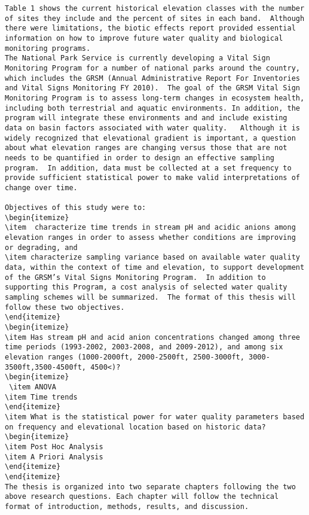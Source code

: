 \begin{verbatim}
Table 1 shows the current historical elevation classes with the number of sites they include and the percent of sites in each band.  Although there were limitations, the biotic effects report provided essential information on how to improve future water quality and biological monitoring programs.
The National Park Service is currently developing a Vital Sign Monitoring Program for a number of national parks around the country, which includes the GRSM (Annual Administrative Report For Inventories and Vital Signs Monitoring FY 2010).  The goal of the GRSM Vital Sign Monitoring Program is to assess long-term changes in ecosystem health, including both terrestrial and aquatic environments. In addition, the program will integrate these environments and and include existing data on basin factors associated with water quality.   Although it is widely recognized that elevational gradient is important, a question about what elevation ranges are changing versus those that are not needs to be quantified in order to design an effective sampling program.  In addition, data must be collected at a set frequency to provide sufficient statistical power to make valid interpretations of change over time. 

Objectives of this study were to:
\begin{itemize}
\item  characterize time trends in stream pH and acidic anions among elevation ranges in order to assess whether conditions are improving or degrading, and 
\item characterize sampling variance based on available water quality data, within the context of time and elevation, to support development of the GRSM’s Vital Signs Monitoring Program.  In addition to supporting this Program, a cost analysis of selected water quality sampling schemes will be summarized.  The format of this thesis will follow these two objectives.  
\end{itemize}
\begin{itemize}
\item Has stream pH and acid anion concentrations changed among three time periods (1993-2002, 2003-2008, and 2009-2012), and among six elevation ranges (1000-2000ft, 2000-2500ft, 2500-3000ft, 3000-3500ft,3500-4500ft, 4500<)?
\begin{itemize}
 \item ANOVA
\item Time trends
\end{itemize}
\item What is the statistical power for water quality parameters based on frequency and elevational location based on historic data?
\begin{itemize}
\item Post Hoc Analysis
\item A Priori Analysis
\end{itemize}
\end{itemize}
The thesis is organized into two separate chapters following the two above research questions. Each chapter will follow the technical format of introduction, methods, results, and discussion.  
\end{verbatim}

